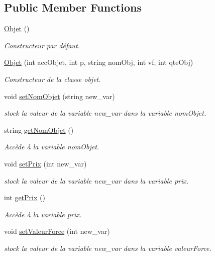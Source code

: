 \subsection*{Public Member Functions}
\begin{DoxyCompactItemize}
\item 
\hyperlink{class_objet_aefdd826d50085897e4894ffef4597d04}{Objet} ()
\begin{DoxyCompactList}\small\item\em Constructeur par défaut. \end{DoxyCompactList}\item 
\hyperlink{class_objet_a6fb1713f353f5ede79c339874be7c29b}{Objet} (int acc\-Objet, int p, string nom\-Obj, int vf, int qte\-Obj)
\begin{DoxyCompactList}\small\item\em Constructeur de la classe objet. \end{DoxyCompactList}\item 
void \hyperlink{class_objet_a63d919b38358563e308c8fa4a6d1d1e8}{set\-Nom\-Objet} (string new\-\_\-var)
\begin{DoxyCompactList}\small\item\em stock la valeur de la variable new\-\_\-var dans la variable nom\-Objet. \end{DoxyCompactList}\item 
string \hyperlink{class_objet_a843e99ecd1e150589f8db23f43dd27b0}{get\-Nom\-Objet} ()
\begin{DoxyCompactList}\small\item\em Accède à la variable nom\-Objet. \end{DoxyCompactList}\item 
void \hyperlink{class_objet_a3b4253aca64e7fa3fb1303449579f3be}{set\-Prix} (int new\-\_\-var)
\begin{DoxyCompactList}\small\item\em stock la valeur de la variable new\-\_\-var dans la variable prix. \end{DoxyCompactList}\item 
int \hyperlink{class_objet_a9b36c37091e821bc8f00d6bfd3665a66}{get\-Prix} ()
\begin{DoxyCompactList}\small\item\em Accède à la variable prix. \end{DoxyCompactList}\item 
void \hyperlink{class_objet_a46ff6cb720f950f6a9cc607427ae98cc}{set\-Valeur\-Force} (int new\-\_\-var)
\begin{DoxyCompactList}\small\item\em stock la valeur de la variable new\-\_\-var dans la variable valeur\-Force. \end{DoxyCompactList}\item 

\end{DoxyCompactItemize}
